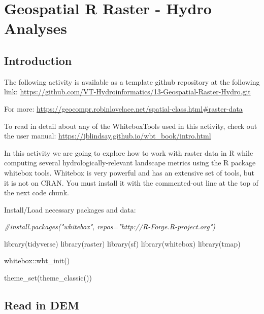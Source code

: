 \documentclass[
]{book}
\newenvironment{Shaded}{\begin{snugshade}}{\end{snugshade}}
\newcommand{\CommentTok}[1]{\textcolor[rgb]{0.56,0.35,0.01}{\textit{#1}}}
\newcommand{\FunctionTok}[1]{\textcolor[rgb]{0.00,0.00,0.00}{#1}}
\newcommand{\NormalTok}[1]{#1}
\newcommand{\SpecialCharTok}[1]{\textcolor[rgb]{0.00,0.00,0.00}{#1}}
\begin{document}
\hypertarget{rgeoraster}{%
\chapter{Geospatial R Raster - Hydro Analyses}\label{rgeoraster}}

\hypertarget{introduction-3}{%
\section{Introduction}\label{introduction-3}}

The following activity is available as a template github repository at the following link: \url{https://github.com/VT-Hydroinformatics/13-Geospatial-Raster-Hydro.git}

For more: \url{https://geocompr.robinlovelace.net/spatial-class.html\#raster-data}

To read in detail about any of the WhiteboxTools used in this activity, check out the user manual: \url{https://jblindsay.github.io/wbt_book/intro.html}

In this activity we are going to explore how to work with raster data in R while computing several hydrologically-relevant landscape metrics using the R package whitebox tools. Whitebox is very powerful and has an extensive set of tools, but it is not on CRAN. You must install it with the commented-out line at the top of the next code chunk.

Install/Load necessary packages and data:

\begin{Shaded}
\begin{Highlighting}[]
\CommentTok{\#install.packages("whitebox", repos="http://R{-}Forge.R{-}project.org")}

\FunctionTok{library}\NormalTok{(tidyverse)}
\FunctionTok{library}\NormalTok{(raster)}
\FunctionTok{library}\NormalTok{(sf)}
\FunctionTok{library}\NormalTok{(whitebox)}
\FunctionTok{library}\NormalTok{(tmap)}

\NormalTok{whitebox}\SpecialCharTok{::}\FunctionTok{wbt\_init}\NormalTok{()}

\FunctionTok{theme\_set}\NormalTok{(}\FunctionTok{theme\_classic}\NormalTok{())}
\end{Highlighting}
\end{Shaded}

\hypertarget{read-in-dem}{%
\section{Read in DEM}\label{read-in-dem}}
\end{document}
